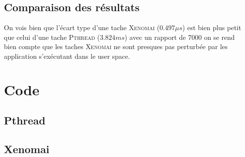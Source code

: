 \documentclass[10pt,a4paper]{article}
\begin{document}
\subsection{Comparaison des résultats}
On vois bien que l’écart type d'une tache \textsc{Xenomai} ($0.497\mu s$) est bien plus petit que celui d'une tache \textsc{Pthread} ($3.824ms$) avec un rapport de 7000 on se rend bien compte que les taches \textsc{Xenomai} ne sont presques pas perturbée par les application s’exécutant dans le user space.

\newpage
\section{Code}
\subsection{Pthread}
\label{codePthread}
\begin{scriptsize}
\end{scriptsize}

\subsection{Xenomai}
\label{codeXenomai}
\begin{scriptsize}
\end{scriptsize}
\end{document}
